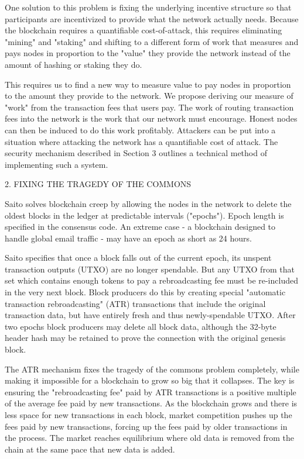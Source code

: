 \documentclass[11pt, oneside]{article}   	%
\begin{document}
\begin{multicols}{2}
One solution to this problem is fixing the underlying incentive structure so that participants are incentivized to provide what the network actually needs. Because the blockchain requires a quantifiable cost-of-attack, this requires eliminating "mining" and "staking" and shifting to a different form of work that measures and pays nodes in proportion to the "value" they provide the network instead of the amount of hashing or staking they do.

This requires us to find a new way to measure value to pay nodes in proportion to the amount they provide to the network. We propose deriving our measure of "work" from the transaction fees that users pay. The work of routing transaction fees into the network is the work that our network must encourage. Honest nodes can then be induced to do this work profitably. Attackers can be put into a situation where attacking the network has a quantifiable cost of attack. The security mechanism described in Section 3 outlines a technical method of implementing such a system.


2. FIXING THE TRAGEDY OF THE COMMONS

Saito solves blockchain creep by allowing the nodes in the network to delete the oldest blocks in the ledger at predictable intervals ("epochs"). Epoch length is specified in the consensus code. An extreme case - a blockchain designed to handle global email traffic - may have an epoch as short as 24 hours.

Saito specifies that once a block falls out of the current epoch, its unspent transaction outputs (UTXO) are no longer spendable. But any UTXO from that set which contains enough tokens to pay a rebroadcasting fee must be re-included in the very next block. Block producers do this by creating special "automatic transaction rebroadcasting" (ATR) transactions that include the original transaction data, but have entirely fresh and thus newly-spendable UTXO. After two epochs block producers may delete all block data, although the 32-byte header hash may be retained to prove the connection with the original genesis block.

The ATR mechanism fixes the tragedy of the commons problem completely, while making it impossible for a blockchain to grow so big that it collapses. The key is ensuring the "rebroadcasting fee" paid by ATR transactions is a positive multiple of the average fee paid by new transactions. As the blockchain grows and there is less space for new transactions in each block, market competition pushes up the fees paid by new transactions, forcing up the fees paid by older transactions in the process. The market reaches equilibrium where old data is removed from the chain at the same pace that new data is added. 


\end{multicols}
\end{document}
